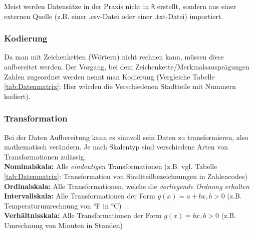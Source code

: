 \documentclass[a4paper]{article}
\newcommand\dangersign{%
 \makebox[1.8em][c]{%
 \makebox[0pt][c]{\raisebox{.15em}{\small!}}%
 \makebox[0pt][c]{\color{red}\Large$\triangle$}}}%
\begin{document}
\noindent {}

\noindent \dangersign Meist werden Datensätze in der Praxis nicht in \texttt{R} erstellt, sondern aus einer externen Quelle (z.B. einer .csv-Datei oder einer .txt-Datei) importiert. 

\noindent {}

\subsubsection{Kodierung}
Da man mit Zeichenketten (Wörtern) nicht rechnen kann, müssen diese aufbereitet werden.
Der Vorgang, bei dem Zeichenkette/Merkmalsausprägungen Zahlen zugeordnet werden nennt man Kodierung (Vergleiche Tabelle \ref{tab:Datenmatrix}: Hier würden die Verschiedenen Stadtteile mit Nummern kodiert).


\subsubsection{Transformation}
Bei der Daten Aufbereitung kann es sinnvoll sein Daten zu transformieren, also mathematisch verändern.
Je nach Skalentyp sind verschiedene Arten von Transformationen zulässig.\\
\textbf{Nominalskala:} Alle \textit{eindeutigen} Transformationen (z.B. vgl. Tabelle \ref{tab:Datenmatrix}: Transformation von Stadtteilbezeichnungen in Zahlencodes)\\
\textbf{Ordinalskala:} Alle Transformationen, welche die \textit{vorliegende Ordnung erhalten}\\
\textbf{Intervallskala:} Alle Transformationen der Form $g(x)=a+bx,  b>0$ (z.B. Temperaturumrechnung von °F in °C)\\
\textbf{Verhältnisskala:} Alle Transformationen der Form $g(x)=bx, b>0$ (z.B. Umrechnung von Minuten in Stunden)
\\
\end{document}

